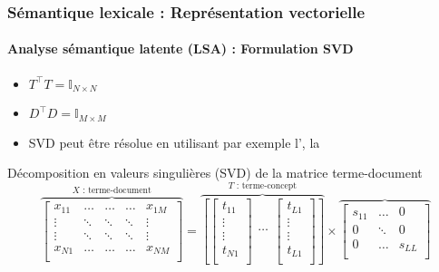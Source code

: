 \documentclass[xcolor=table]{beamer}
\begin{document}
\begin{frame}
	\frametitle{Sémantique lexicale : Représentation vectorielle}
	\framesubtitle{Analyse sémantique latente (LSA) : Formulation SVD}
	
	\begin{itemize}
		\item $T^\top T = \mathbb{I}_{N \times N}$ 
		\item $D^\top D = \mathbb{I}_{M \times M}$ 
		\item SVD peut être résolue en utilisant par exemple l', la 
	\end{itemize}
	
	\begin{block}{Décomposition en valeurs singulières (SVD) de la matrice terme-document}
		\scriptsize\bfseries
		\[
		\overbrace{
			\begin{bmatrix}
			x_{11} & \ldots & \ldots & \ldots & x_{1M} \\ 
			\vdots & \ddots & \ddots & \ddots &\vdots \\
			\vdots & \ddots & \ddots & \ddots &\vdots \\
			x_{N1} & \ldots & \ldots & \ldots & x_{NM} \\ 
			\end{bmatrix}
		}^{X \text{ : terme-document}}
		=
		\overbrace{
			\left[
			\begin{bmatrix}
			t_{11} \\ 
			\vdots \\
			\vdots \\
			t_{N1} \\ 
			\end{bmatrix}
			\begin{matrix}
			\ldots \\ 
			\end{matrix}
			\begin{bmatrix}
			t_{L1} \\ 
			\vdots \\
			\vdots \\
			t_{L1} \\ 
			\end{bmatrix}
			\right]
		}^{T \text{ : terme-concept}}
		\times 
		\overbrace{
			\begin{bmatrix}
			s_{11} & \ldots & 0 \\
			0 & \ddots & 0 \\
			0 & \ldots & s_{LL} \\
			\end{bmatrix}
}\]
\end{block}
\end{frame}
\end{document}

